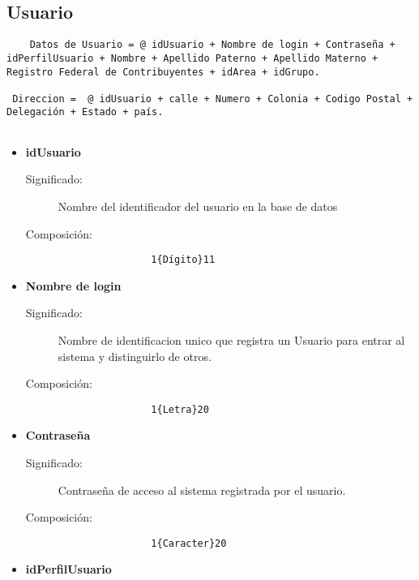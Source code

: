 \subsection{Usuario}\label{dd:Usuario}
\begin{lstlisting}
	Datos de Usuario = @ idUsuario + Nombre de login + Contraseña + idPerfilUsuario + Nombre + Apellido Paterno + Apellido Materno + Registro Federal de Contribuyentes + idArea + idGrupo.
  
 Direccion =  @ idUsuario + calle + Numero + Colonia + Codigo Postal + Delegación + Estado + país.
 
\end{lstlisting}
\begin{itemize}
	\item	\textbf{idUsuario}\label{dd:idUsuario}
		\begin{description}
			\item [Significado:] Nombre del identificador del usuario en la base de datos
			\item [Composición:]{\begin{lstlisting}
				1{Dígito}11\end{lstlisting}}
		\end{description}
	\item \textbf{Nombre de login}\label{dd:login}
		\begin{description}
			\item [Significado:] Nombre de identificacion unico que registra un Usuario para entrar al sistema y distinguirlo de otros.
			\item [Composición:]{\begin{lstlisting}
				1{Letra}20\end{lstlisting}}
		\end{description}
	\item \textbf{Contraseña}\label{dd:psw}
		\begin{description}
			\item [Significado:] Contraseña de acceso al sistema registrada por el usuario.
			\item [Composición:]{\begin{lstlisting}
				1{Caracter}20\end{lstlisting}}
		\end{description}
  \item \textbf{idPerfilUsuario} \label{dd:idPerfilUsuario}
    \begin{description}

\end{description}
\end{itemize}
